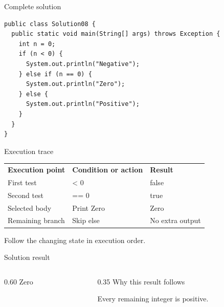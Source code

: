 \documentclass[10pt,aspectratio=169]{beamer}
\begin{document}
\begin{frame}[fragile,t]{Complete solution}
\begin{lstlisting}
public class Solution08 {
  public static void main(String[] args) throws Exception {
    int n = 0;
    if (n < 0) {
      System.out.println("Negative");
    } else if (n == 0) {
      System.out.println("Zero");
    } else {
      System.out.println("Positive");
    }
  }
}
\end{lstlisting}
\end{frame}

\begin{frame}[fragile,t]{Execution trace}
\small\renewcommand{\arraystretch}{1.5}
\begin{tabularx}{\textwidth}{>{\raggedright\arraybackslash}X>{\raggedright\arraybackslash}X>{\raggedright\arraybackslash}X}
\rowcolor{navy}
\color{white}\bfseries Execution point & \color{white}\bfseries Condition or action & \color{white}\bfseries Result\\
First test & 0 \textless{} 0 & false\\
Second test & 0 == 0 & true\\
Selected body & Print Zero & Zero\\
Remaining branch & Skip else & No extra output\\
\end{tabularx}
\vspace{3mm}\footnotesize Follow the changing state in execution order.
\end{frame}

\begin{frame}[fragile,t]{Solution result}
\begin{columns}[T,onlytextwidth]\begin{column}{0.60\textwidth}
Zero
\end{column}\begin{column}{0.35\textwidth}\small
Why this result follows

Every remaining integer is positive.
\end{column}\end{columns}
\end{frame}
\end{document}
